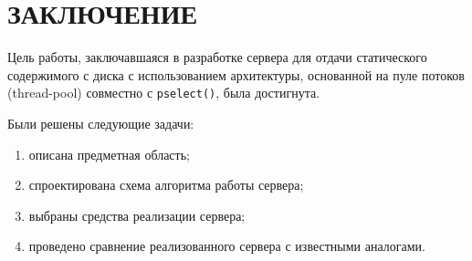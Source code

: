 \chapter*{ЗАКЛЮЧЕНИЕ}

Цель работы, заключавшаяся в разработке сервера для отдачи статического содержимого с диска с использованием архитектуры, основанной на пуле потоков (thread-pool) совместно с \texttt{pselect()}, была достигнута.

Были решены следующие задачи:
\begin{enumerate}
	\item описана предметная область;
	\item спроектирована схема алгоритма работы сервера;
	\item выбраны средства реализации сервера;
	\item проведено сравнение реализованного сервера с известными аналогами.
\end{enumerate}